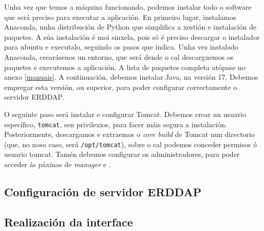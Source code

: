 Unha vez que temos a máquina funcionando, podemos instalar todo o software que será preciso para executar a aplicación. En primeiro lugar, instalamos Anaconda, unha distribución de Python que
simplifica a xestión e instalación de paquetes. A súa instalación é moi sinxela, pois só é preciso descargar o instalador para ubuntu e executalo, seguindo os pasos que indica. Unha vez instalado
Anaconda, crearásenos un entorno, que será dende o cal descarguemos os paquetes e executemos a aplicación. A lista de paquetes completa atópase no anexo \ref{manuais}. A continuación, debemos
instalar Java, na versión 17. Debemos empregar esta versión, ou superior, para poder configurar correctamente o servidor ERDDAP.

O seguinte paso será instalar e configurar Tomcat. Debemos crear un usuario específico, \texttt{tomcat}, sen privilexios, para facer máis segura a instalación. Posteriormente, descargamos e
extraemos o \textit{core build} de Tomcat nun directorio (que, no noso caso, será \texttt{/opt/tomcat}), sobre o cal podemos conceder permisos ó usuario tomcat. Tamén debemos configurar os
administradores, para poder acceder ás páxinas de \textit{manager} e .


\subsection{Configuración de servidor ERDDAP}\label{erddapconf}


\subsection{Realización da interface}\label{interface}